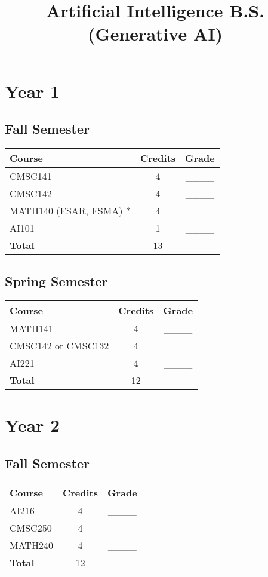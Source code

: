\documentclass{article}
\title{Artificial Intelligence B.S. (Generative AI)}
\author{}
\date{}
\begin{document}
\maketitle

\section*{Year 1}
\subsection*{Fall Semester}
\begin{tabular}{|l|c|c|}
    \hline
    Course & Credits & Grade \\
    \hline
    CMSC141 & 4 & ____ \\
    CMSC142 & 4 & ____ \\
    MATH140 (FSAR, FSMA) * & 4 & ____ \\
    AI101 & 1 & ____ \\
    \hline
    \textbf{Total} & 13 & \\
    \hline
\end{tabular}

\subsection*{Spring Semester}
\begin{tabular}{|l|c|c|}
    \hline
    Course & Credits & Grade \\
    \hline
    MATH141 & 4 & ____ \\
    CMSC142 or CMSC132 & 4 & ____ \\
    AI221 & 4 & ____ \\
    \hline
    \textbf{Total} & 12 & \\
    \hline
\end{tabular}

\section*{Year 2}
\subsection*{Fall Semester}
\begin{tabular}{|l|c|c|}
    \hline
    Course & Credits & Grade \\
    \hline
    AI216 & 4 & ____ \\
    CMSC250 & 4 & ____ \\
    MATH240 & 4 & ____ \\
    \hline
    \textbf{Total} & 12 & \\
    \hline
\end{tabular}
\end{document}
